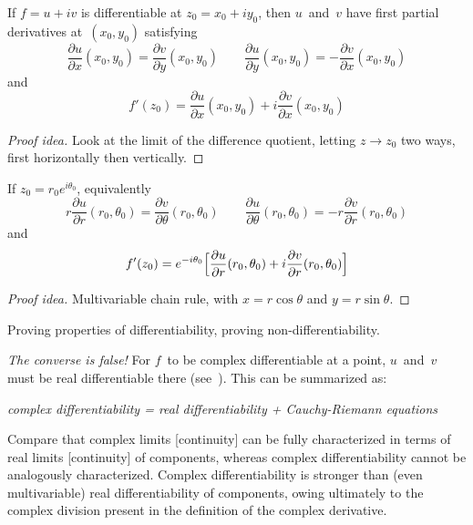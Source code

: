 \begin{thm}
If \(f=u+iv\) is differentiable at \(z_0=x_0+iy_0\), then \(u\)~and~\(v\) have first partial derivatives at~\((x_0,y_0)\) satisfying
\[\frac{\partial u}{\partial x}(x_0,y_0)=\frac{\partial v}{\partial y}(x_0,y_0)\qquad\frac{\partial u}{\partial y}(x_0,y_0)=-\frac{\partial v}{\partial x}(x_0,y_0)\]
and
\[f'(z_0)=\frac{\partial u}{\partial x}(x_0,y_0)+i\frac{\partial v}{\partial x}(x_0,y_0)\]
\end{thm}
\begin{proof}[Proof idea]
Look at the limit of the difference quotient, letting \(z\to z_0\) two ways, first horizontally then vertically.
\end{proof}
\begin{cor}
If \(z_0=r_0e^{i\theta_0}\), equivalently
\[r\frac{\partial u}{\partial r}(r_0,\theta_0)=\frac{\partial v}{\partial\theta}(r_0,\theta_0)\qquad\frac{\partial u}{\partial\theta}(r_0,\theta_0)=-r\frac{\partial v}{\partial r}(r_0,\theta_0)\]
and
\[f'(z_0)=e^{-i\theta_0}\Bigl[\frac{\partial u}{\partial r}(r_0,\theta_0)+i\frac{\partial v}{\partial r}(r_0,\theta_0)\Bigr]\]
\end{cor}
\begin{proof}[Proof idea]
Multivariable chain rule, with \(x=r\cos\theta\) and \(y=r\sin\theta\).
\end{proof}
\begin{app}
Proving properties of differentiability, proving non-differentiability.
\end{app}
\begin{rmk}
\emph{The converse is false!} For \(f\)~to be complex differentiable at a point, \(u\)~and~\(v\) must be real differentiable there (see~\cite[\S II.5]{sarason94}). This can be summarized as:
\begin{center}
\emph{complex differentiability = real differentiability + Cauchy-Riemann equations}
\end{center}
\end{rmk}
\begin{rmk}
Compare that complex limits [continuity] can be fully characterized in terms of real limits [continuity] of components, whereas complex differentiability cannot be analogously characterized. Complex differentiability is stronger than (even multivariable) real differentiability of components, owing ultimately to the complex division present in the definition of the complex derivative.
\end{rmk}

